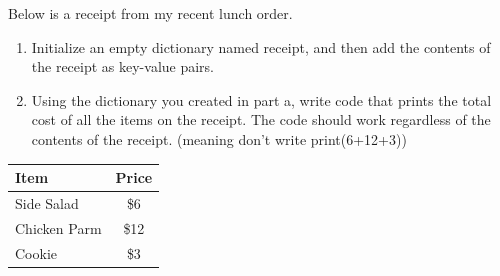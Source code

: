 	\item 	
		Below is a receipt from my recent lunch order.
		\begin{enumerate}
			\item Initialize an empty dictionary named receipt, and then add the contents of 
				the receipt as key-value pairs.
			\item Using the dictionary you created in part a, write code that prints the 
				total cost of all the items on the receipt.  The code should work regardless
				of the contents of the receipt. (meaning don't write print(6+12+3))
		\end{enumerate}	
		\begin{center}
		        \begin{tabular}{l|c}
		            \textbf{Item} & \textbf{Price} \\ \hline
		            Side Salad & \$6 \\
		            Chicken Parm & \$12 \\
		            Cookie & \$3 \\
		        \end{tabular}
		\end{center}

